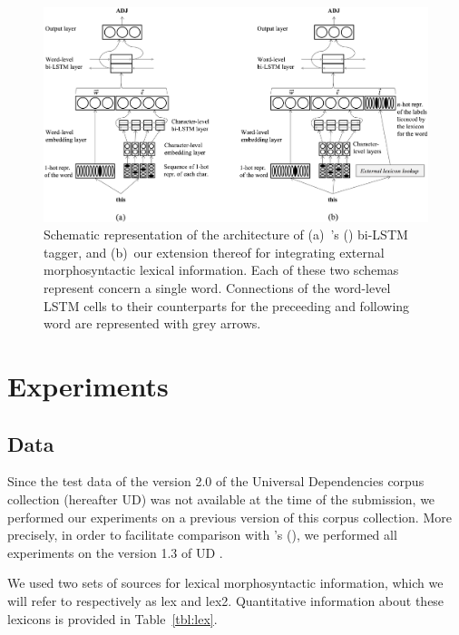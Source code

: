 \documentclass[11pt,letterpaper]{article}
\begin{document}
\begin{figure}
\includegraphics[width=\linewidth]{emnlp17schema}
\caption{Schematic representation of the architecture of (a)~\citeauthor{plank16}'s (\citeyear{plank16}) bi-LSTM tagger,
and (b)~our extension thereof for integrating external morphosyntactic lexical information. Each of these two schemas
represent concern a single word. Connections of the word-level LSTM cells to their counterparts for the preceeding and
following word are represented with grey arrows.}\label{fig:schema}
\end{figure}

\section{Experiments}

\subsection{Data}

Since the test data of the version 2.0 of the Universal Dependencies corpus collection (hereafter UD) was not available
at the time of the submission, we performed our experiments on a previous version of this corpus collection. More
precisely, in order to facilitate comparison with \citeauthor{plank16}'s (\citeyear{plank16}), we performed all
experiments on the version 1.3 of UD \cite{ud13}.

We used two sets of sources for lexical morphosyntactic information, which we will refer to respectively as {\sc lex}
and {\sc lex2}. Quantitative information about these lexicons is provided in Table~\ref{tbl:lex}.
\end{document}
